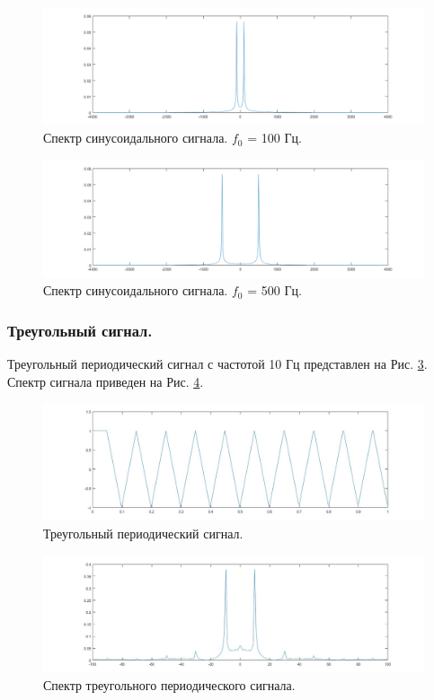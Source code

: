 \documentclass[a4paper,14pt]{extarticle}
\begin{document}
\begin{figure}[H]
\centering
\includegraphics[scale=0.5]{pics/1sin100Hz_spec.png}
\caption{Спектр синусоидального сигнала. $f_0$ = 100 Гц.}
\label{sin100_}
\end{figure}
\begin{figure}[H]
\centering
\includegraphics[scale=0.5]{pics/1sin500Hz_spec.png}
\caption{Спектр синусоидального сигнала. $f_0$ = 500 Гц.}
\label{sin500_}
\end{figure}

\subsubsection{Треугольный сигнал.}
Треугольный периодический сигнал с частотой 10 Гц представлен на Рис. \ref{treug}. Спектр сигнала приведен на Рис. \ref{treug_}.
\begin{figure}[H]
\centering
\includegraphics[scale=0.5]{pics/1treug.jpg}
\caption{Треугольный периодический сигнал.}
\label{treug}
\end{figure}
\begin{figure}[H]
\centering
\includegraphics[scale=0.5]{pics/1treug_spec.jpg}
\caption{Спектр треугольного периодического сигнала.}
\label{treug_}
\end{figure}
\end{document}
